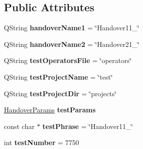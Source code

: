 \subsection*{Public Attributes}
\begin{DoxyCompactItemize}
\item 
Q\+String {\bfseries handover\+Name1} = \char`\"{}Handover11\+\_\char`\"{}\hypertarget{class_handover_data___test_ac50018bf1c091fab93c6eabe9b09ab30}{}\label{class_handover_data___test_ac50018bf1c091fab93c6eabe9b09ab30}

\item 
Q\+String {\bfseries handover\+Name2} = \char`\"{}Handover21\+\_\char`\"{}\hypertarget{class_handover_data___test_a1cef767b4374585c6bdc612a24cad021}{}\label{class_handover_data___test_a1cef767b4374585c6bdc612a24cad021}

\item 
Q\+String {\bfseries test\+Operators\+File} = \char`\"{}operators\char`\"{}\hypertarget{class_handover_data___test_a9aa22d6bbdaf5c780a2a72882ed69a27}{}\label{class_handover_data___test_a9aa22d6bbdaf5c780a2a72882ed69a27}

\item 
Q\+String {\bfseries test\+Project\+Name} = \char`\"{}test\char`\"{}\hypertarget{class_handover_data___test_acee03177b190c2de467e0283de8bde86}{}\label{class_handover_data___test_acee03177b190c2de467e0283de8bde86}

\item 
Q\+String {\bfseries test\+Project\+Dir} = \char`\"{}projects\char`\"{}\hypertarget{class_handover_data___test_a35ec0bc1c07c5a5120bc59cc3cf99c45}{}\label{class_handover_data___test_a35ec0bc1c07c5a5120bc59cc3cf99c45}

\item 
\hyperlink{struct_handover_params}{Handover\+Params} {\bfseries test\+Params}\hypertarget{class_handover_data___test_aa581126ae6478661e3e01037ed07301b}{}\label{class_handover_data___test_aa581126ae6478661e3e01037ed07301b}

\item 
const char $\ast$ {\bfseries test\+Phrase} = \char`\"{}Handover11\+\_\char`\"{}\hypertarget{class_handover_data___test_a7191a3fb1fd66b6c065854bed04992d8}{}\label{class_handover_data___test_a7191a3fb1fd66b6c065854bed04992d8}

\item 
int {\bfseries test\+Number} = 7750\hypertarget{class_handover_data___test_a95bf3f94c2823b09376499b6122fe7f4}{}\label{class_handover_data___test_a95bf3f94c2823b09376499b6122fe7f4}

\end{DoxyCompactItemize}



